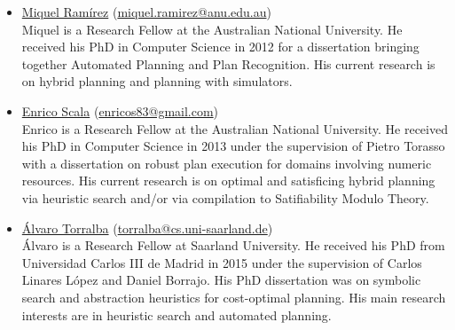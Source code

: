 \documentclass[10pt]{article}
\begin{document}
\begin{itemize}
  
% 
\item \href{http://people.cecs.anu.edu.au/user/5404}{Miquel Ram\'{i}rez} 
  (\href{mailto:miquel.ramirez@anu.edu.au}{miquel.ramirez@anu.edu.au})\\
Miquel is a Research Fellow at the Australian National University. He 
received his PhD in Computer Science in 2012 for a dissertation 
bringing together Automated Planning and Plan Recognition. His current
research is on hybrid planning and planning with simulators.


\item \href{http://www.hstairs.com/}{Enrico Scala} 
(\href{enricos83@gmail.com}{enricos83@gmail.com})\\
Enrico is a Research Fellow at the Australian National University. He 
received his PhD in Computer Science in 2013 under the supervision of Pietro Torasso with a dissertation on robust plan execution for domains involving numeric resources. His current research is on optimal and satisficing hybrid planning via heuristic search and/or via compilation to Satifiability Modulo Theory.


\item \href{https://fai.cs.uni-saarland.de/torralba/}{\'{A}lvaro
  Torralba}
  (\href{mailto:torralba@cs.uni-saarland.de}{torralba@cs.uni-saarland.de})\\ \'{A}lvaro
  is a Research Fellow at Saarland University. He received his PhD
  from Universidad Carlos III de Madrid in 2015 under the supervision
  of Carlos Linares L\'{o}pez and Daniel Borrajo. His PhD dissertation
  was on symbolic search and abstraction heuristics for cost-optimal
  planning. His main research interests are in heuristic search and
  automated planning.

  
\end{itemize}
\end{document}

